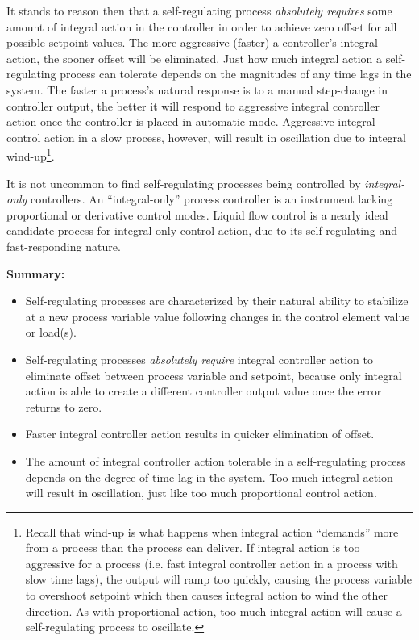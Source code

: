 It stands to reason then that a self-regulating process \textit{absolutely requires} some amount of integral action in the controller in order to achieve zero offset for all possible setpoint values.  The more aggressive (faster) a controller's integral action, the sooner offset will be eliminated.  Just how much integral action a self-regulating process can tolerate depends on the magnitudes of any time lags in the system.  The faster a process's natural response is to a manual step-change in controller output, the better it will respond to aggressive integral controller action once the controller is placed in automatic mode.  Aggressive integral control action in a slow process, however, will result in oscillation due to integral wind-up\footnote{Recall that wind-up is what happens when integral action ``demands'' more from a process than the process can deliver.  If integral action is too aggressive for a process (i.e. fast integral controller action in a process with slow time lags), the output will ramp too quickly, causing the process variable to overshoot setpoint which then causes integral action to wind the other direction.  As with proportional action, too much integral action will cause a self-regulating process to oscillate.}.    

It is not uncommon to find self-regulating processes being controlled by \textit{integral-only} controllers.  An ``integral-only'' process controller is an instrument lacking proportional or derivative control modes.  Liquid flow control is a nearly ideal candidate process for integral-only control action, due to its self-regulating and fast-responding nature.

\vskip 10pt

\noindent
\textbf{Summary:}

\begin{itemize}
\item Self-regulating processes are characterized by their natural ability to stabilize at a new process variable value following changes in the control element value or load(s).
\item Self-regulating processes \textit{absolutely require} integral controller action to eliminate offset between process variable and setpoint, because only integral action is able to create a different controller output value once the error returns to zero.
\item Faster integral controller action results in quicker elimination of offset.
\item The amount of integral controller action tolerable in a self-regulating process depends on the degree of time lag in the system.  Too much integral action will result in oscillation, just like too much proportional control action.
\end{itemize}





